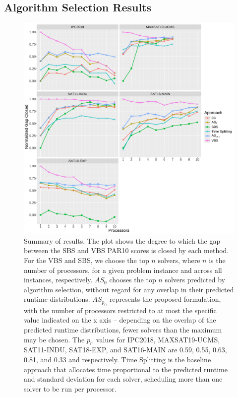 \subsection{Algorithm Selection Results}
\begin{figure}
        \includegraphics[width=\linewidth]{plots/line_chart_parallel_NormalizedGap_2col.pdf}    
    \caption[Results Summary: Comparing $AS_{p_{\cap}}$ with Baselines]{
    Summary of results. The plot shows the degree to which the gap between the SBS and VBS PAR10 scores is closed by each method. For the VBS and SBS, we choose the top $n$ solvers, where $n$ is the number of processors, for a given problem instance and across all instances, respectively. $AS_0$ chooses the top $n$ solvers predicted by algorithm selection, without regard for any overlap in their predicted runtime distributions. $AS_{p_{\cap}}$ represents the proposed formulation, with the number of processors restricted to at most the specific value indicated on the x axis -- depending on the overlap of the predicted runtime distributions, fewer solvers than the maximum may be chosen. The $p_{\cap}$ values for IPC2018, MAXSAT19-UCMS, SAT11-INDU, SAT18-EXP, and SAT16-MAIN are 0.59, 0.55, 0.63, 0.81, and 0.33 and respectively. Time Splitting is the baseline approach that allocates time proportional to the predicted runtime and standard deviation for each solver, scheduling more than one solver to be run per processor.}
    \label{fig:all_results}
\end{figure}

